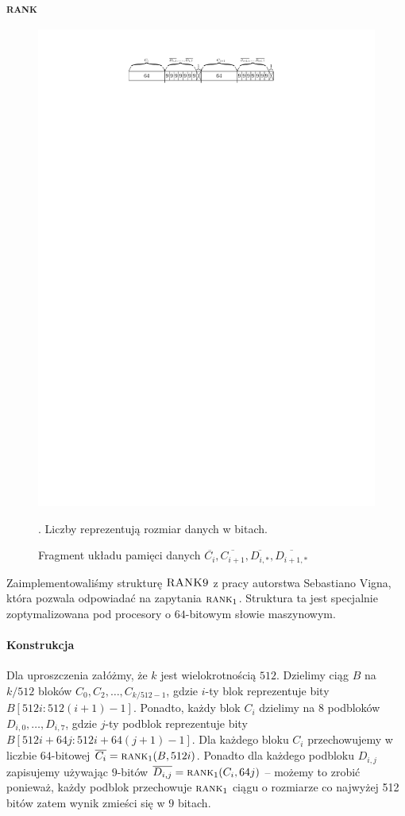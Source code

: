 \subsubsection{\textsc{rank}}
\begin{figure}[H]
    \centering
    \includegraphics[scale=1.2]{images/rank9-mem-layout.pdf}
    \caption{Fragment układu pamięci danych $\overline{C_i}, \overline{C_{i+1}}, \overline{D_{i,*}}, \overline{D_{i+1,*}}$}. Liczby reprezentują rozmiar danych w bitach.
    \label{fig:rank9-mem}
\end{figure}
Zaimplementowaliśmy strukturę $\textsc{RANK9}$ z pracy \cite{vign08} autorstwa Sebastiano Vigna, która pozwala odpowiadać na zapytania $\textsc{rank}_1$. Struktura ta jest specjalnie zoptymalizowana pod procesory o $64$-bitowym słowie maszynowym.
\paragraph{Konstrukcja}
Dla uproszczenia załóżmy, że $k$ jest wielokrotnością $512$. Dzielimy ciąg $B$ na $k/512$ bloków $C_0, C_2, \dots, C_{k/512-1}$, gdzie $i$-ty blok reprezentuje bity $B[512i:512(i+1)-1]$. Ponadto, każdy blok $C_i$ dzielimy na 8 podbloków $D_{i,0}, \dots, D_{i,7}$, gdzie $j$-ty podblok reprezentuje bity $B[512i+64j: 512i+64(j+1)-1]$. Dla każdego bloku $C_i$ przechowujemy w liczbie $64$-bitowej $\overline{C_i}=\textsc{rank}_1(B, 512i)$. Ponadto dla każdego podbloku $D_{i,j}$ zapisujemy używając $9$-bitów $\overline{D_{i,j}}=\textsc{rank}_1(C_i, 64j)$ -- możemy to zrobić ponieważ, każdy podblok przechowuje $\textsc{rank}_1$ ciągu o rozmiarze co najwyżej 512 bitów zatem wynik zmieści się w $9$ bitach.
